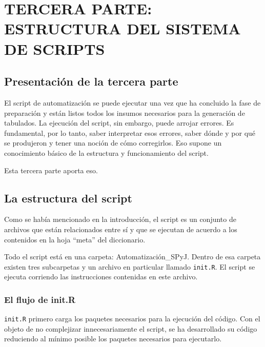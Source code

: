 \documentclass[
  spanish,
]{book}
\begin{document}
\hypertarget{part-tercera-parte-estructura-del-sistema-de-scripts}{%
\part*{TERCERA PARTE: ESTRUCTURA DEL SISTEMA DE SCRIPTS}\label{part-tercera-parte-estructura-del-sistema-de-scripts}}

\hypertarget{presentaciuxf3n-de-la-tercera-parte}{%
\chapter*{Presentación de la tercera parte}\label{presentaciuxf3n-de-la-tercera-parte}}

El script de automatización se puede ejecutar una vez que ha concluido la fase de preparación y están listos todos los insumos necesarios para la generación de tabulados. La ejecución del script, sin embargo, puede arrojar errores. Es fundamental, por lo tanto, saber interpretar esos errores, saber dónde y por qué se produjeron y tener una noción de cómo corregirlos. Eso supone un conocimiento básico de la estructura y funcionamiento del script.

Esta tercera parte aporta eso.

\hypertarget{la-estructura-del-script}{%
\chapter{La estructura del script}\label{la-estructura-del-script}}

Como se había mencionado en la introducción, el script es un conjunto de archivos que están relacionados entre sí y que se ejecutan de acuerdo a los contenidos en la hoja ``meta'' del diccionario.

Todo el script está en una carpeta: Automatización\_SPyJ. Dentro de esa carpeta existen tres subcarpetas y un archivo en particular llamado \texttt{init.R}. El script se ejecuta corriendo las instrucciones contenidas en este archivo.

\hypertarget{el-flujo-de-init.r}{%
\section{El flujo de init.R}\label{el-flujo-de-init.r}}

\texttt{init.R} primero carga los paquetes necesarios para la ejecución del código. Con el objeto de no complejizar innecesariamente el script, se ha desarrollado su código reduciendo al mínimo posible los paquetes necesarios para ejecutarlo.
\end{document}
